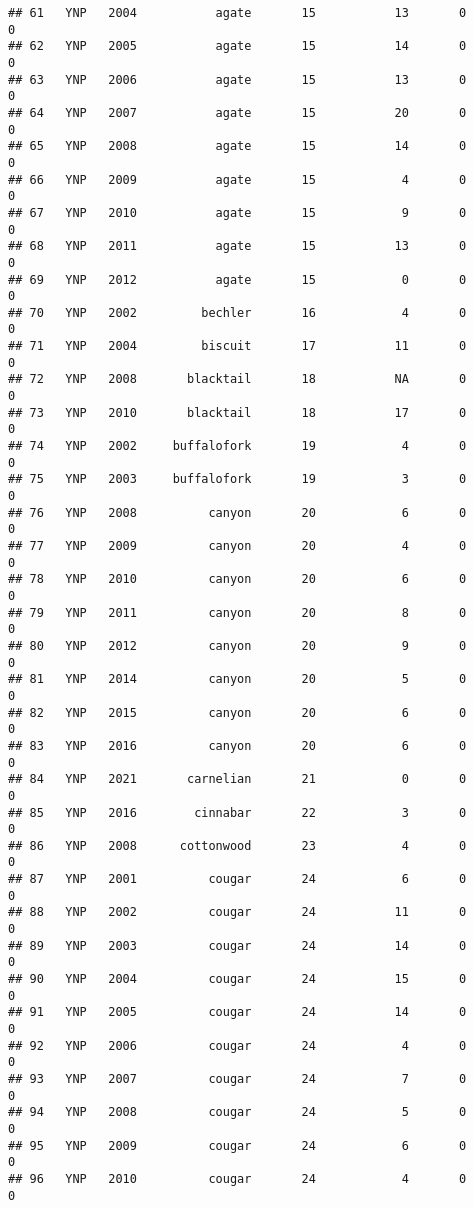 \documentclass[
]{article}
\begin{document}
\begin{verbatim}
## 61   YNP   2004           agate       15           13       0        0
## 62   YNP   2005           agate       15           14       0        0
## 63   YNP   2006           agate       15           13       0        0
## 64   YNP   2007           agate       15           20       0        0
## 65   YNP   2008           agate       15           14       0        0
## 66   YNP   2009           agate       15            4       0        0
## 67   YNP   2010           agate       15            9       0        0
## 68   YNP   2011           agate       15           13       0        0
## 69   YNP   2012           agate       15            0       0        0
## 70   YNP   2002         bechler       16            4       0        0
## 71   YNP   2004         biscuit       17           11       0        0
## 72   YNP   2008       blacktail       18           NA       0        0
## 73   YNP   2010       blacktail       18           17       0        0
## 74   YNP   2002     buffalofork       19            4       0        0
## 75   YNP   2003     buffalofork       19            3       0        0
## 76   YNP   2008          canyon       20            6       0        0
## 77   YNP   2009          canyon       20            4       0        0
## 78   YNP   2010          canyon       20            6       0        0
## 79   YNP   2011          canyon       20            8       0        0
## 80   YNP   2012          canyon       20            9       0        0
## 81   YNP   2014          canyon       20            5       0        0
## 82   YNP   2015          canyon       20            6       0        0
## 83   YNP   2016          canyon       20            6       0        0
## 84   YNP   2021       carnelian       21            0       0        0
## 85   YNP   2016        cinnabar       22            3       0        0
## 86   YNP   2008      cottonwood       23            4       0        0
## 87   YNP   2001          cougar       24            6       0        0
## 88   YNP   2002          cougar       24           11       0        0
## 89   YNP   2003          cougar       24           14       0        0
## 90   YNP   2004          cougar       24           15       0        0
## 91   YNP   2005          cougar       24           14       0        0
## 92   YNP   2006          cougar       24            4       0        0
## 93   YNP   2007          cougar       24            7       0        0
## 94   YNP   2008          cougar       24            5       0        0
## 95   YNP   2009          cougar       24            6       0        0
## 96   YNP   2010          cougar       24            4       0        0

\end{verbatim}
\end{document}
